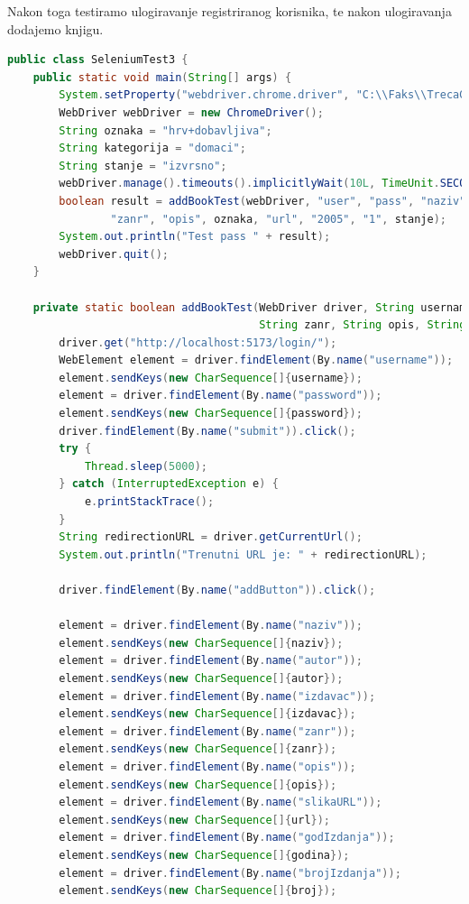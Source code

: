 			Nakon toga testiramo ulogiravanje registriranog korisnika, te nakon ulogiravanja dodajemo knjigu.
                  \begin{lstlisting}[language=Java, label=l0st:java_example, basicstyle=\scriptsize]
 public class SeleniumTest3 {
    public static void main(String[] args) {
        System.setProperty("webdriver.chrome.driver", "C:\\Faks\\TrecaGod\\PROGI\\Projekt\\chromedriver-win64\\chromedriver.exe");
        WebDriver webDriver = new ChromeDriver();
        String oznaka = "hrv+dobavljiva";
        String kategorija = "domaci";
        String stanje = "izvrsno";
        webDriver.manage().timeouts().implicitlyWait(10L, TimeUnit.SECONDS);
        boolean result = addBookTest(webDriver, "user", "pass", "naziv", "autor", "izdavac", kategorija,
                "zanr", "opis", oznaka, "url", "2005", "1", stanje);
        System.out.println("Test pass " + result);
        webDriver.quit();
    }

    private static boolean addBookTest(WebDriver driver, String username, String password, String naziv, String autor, String izdavac, String kategorija,
                                       String zanr, String opis, String oznaka, String url, String godina, String broj, String stanje){
        driver.get("http://localhost:5173/login/");
        WebElement element = driver.findElement(By.name("username"));
        element.sendKeys(new CharSequence[]{username});
        element = driver.findElement(By.name("password"));
        element.sendKeys(new CharSequence[]{password});
        driver.findElement(By.name("submit")).click();
        try {
            Thread.sleep(5000);
        } catch (InterruptedException e) {
            e.printStackTrace();
        }
        String redirectionURL = driver.getCurrentUrl();
        System.out.println("Trenutni URL je: " + redirectionURL);

        driver.findElement(By.name("addButton")).click();

        element = driver.findElement(By.name("naziv"));
        element.sendKeys(new CharSequence[]{naziv});
        element = driver.findElement(By.name("autor"));
        element.sendKeys(new CharSequence[]{autor});
        element = driver.findElement(By.name("izdavac"));
        element.sendKeys(new CharSequence[]{izdavac});
        element = driver.findElement(By.name("zanr"));
        element.sendKeys(new CharSequence[]{zanr});
        element = driver.findElement(By.name("opis"));
        element.sendKeys(new CharSequence[]{opis});
        element = driver.findElement(By.name("slikaURL"));
        element.sendKeys(new CharSequence[]{url});
        element = driver.findElement(By.name("godIzdanja"));
        element.sendKeys(new CharSequence[]{godina});
        element = driver.findElement(By.name("brojIzdanja"));
        element.sendKeys(new CharSequence[]{broj});


\end{lstlisting}
